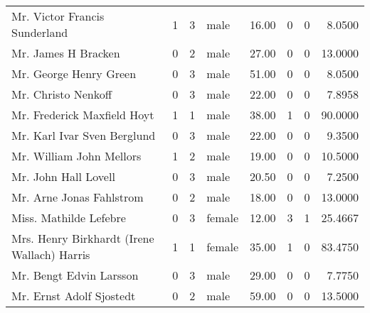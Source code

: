 \begin{tabular}{lrrlrrrr}
Mr. Victor Francis Sunderland                      &         1 &       3 &    male &  16.00 &                        0 &                        0 &    8.0500 \\
Mr. James H Bracken                                &         0 &       2 &    male &  27.00 &                        0 &                        0 &   13.0000 \\
Mr. George Henry Green                             &         0 &       3 &    male &  51.00 &                        0 &                        0 &    8.0500 \\
Mr. Christo Nenkoff                                &         0 &       3 &    male &  22.00 &                        0 &                        0 &    7.8958 \\
Mr. Frederick Maxfield Hoyt                        &         1 &       1 &    male &  38.00 &                        1 &                        0 &   90.0000 \\
Mr. Karl Ivar Sven Berglund                        &         0 &       3 &    male &  22.00 &                        0 &                        0 &    9.3500 \\
Mr. William John Mellors                           &         1 &       2 &    male &  19.00 &                        0 &                        0 &   10.5000 \\
Mr. John Hall Lovell                               &         0 &       3 &    male &  20.50 &                        0 &                        0 &    7.2500 \\
Mr. Arne Jonas Fahlstrom                           &         0 &       2 &    male &  18.00 &                        0 &                        0 &   13.0000 \\
Miss. Mathilde Lefebre                             &         0 &       3 &  female &  12.00 &                        3 &                        1 &   25.4667 \\
Mrs. Henry Birkhardt (Irene Wallach) Harris        &         1 &       1 &  female &  35.00 &                        1 &                        0 &   83.4750 \\
Mr. Bengt Edvin Larsson                            &         0 &       3 &    male &  29.00 &                        0 &                        0 &    7.7750 \\
Mr. Ernst Adolf Sjostedt                           &         0 &       2 &    male &  59.00 &                        0 &                        0 &   13.5000 \\

\end{tabular}
